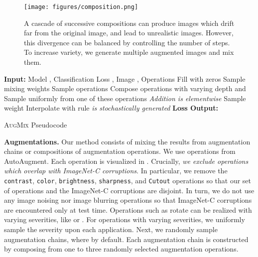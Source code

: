 \documentclass{article} \usepackage{iclr2020_conference,times}
\newcommand{\AlgComment}[1]{\hfill \textit{#1}}
\begin{document}
\begin{figure}[t]
\centering
\texttt{[image: figures/composition.png]}
\caption{A cascade of successive compositions can produce images which drift far from the original image, and lead to unrealistic images. However, this divergence can be balanced by controlling the number of steps. To increase variety, we generate multiple augmented images and mix them. }
\vspace{-10pt}
\label{fig:composition}
\end{figure}




\begin{algorithm}[ht]\renewcommand{\thealgorithm}{}
	\begin{algorithmic}[1]
		\STATE \textbf{Input:} Model , Classification Loss , Image , Operations 
		\STATE Fill  with zeros
		\STATE Sample mixing weights 
		\FOR{}
        \STATE Sample operations 
\STATE Compose operations with varying depth  and  
        \STATE Sample uniformly from one of these operations 
        \STATE  \AlgComment{Addition is elementwise}
		\ENDFOR
		\STATE Sample weight 
		\STATE Interpolate with rule 
		\RETURN{}
        \EndFunction
	    \STATE 
	    \AlgComment{ is stochastically generated} \STATE  
	    \AlgComment{} 
\STATE{}\textbf{Loss Output:} 
		\end{algorithmic}
	\caption{\textsc{AugMix} Pseudocode}
	\label{algo:augmix}
\end{algorithm}


\noindent\textbf{Augmentations.}
Our method consists of mixing the results from augmentation chains or compositions of augmentation operations. We use operations from AutoAugment. Each operation is visualized in . Crucially, \emph{we exclude operations which overlap with ImageNet-C corruptions}. In particular, we remove the \texttt{contrast}, \texttt{color}, \texttt{brightness}, \texttt{sharpness}, and \texttt{Cutout} operations so that our set of operations and the ImageNet-C corruptions are disjoint. In turn, we do not use any image noising nor image blurring operations so that ImageNet-C corruptions are encountered only at test time. Operations such as rotate can be realized with varying severities, like  or . For operations with varying severities, we uniformly sample the severity upon each application. Next, we randomly sample  augmentation chains, where  by default. Each augmentation chain is constructed by composing from one to three randomly selected augmentation operations.
\end{document}
